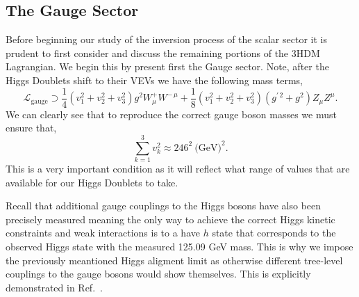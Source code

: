 % 
%

\subsection{The Gauge Sector}

Before beginning our study of the inversion process of the scalar sector it is prudent to first consider and discuss the remaining portions of the 3HDM Lagrangian. 
%
We begin this by present first the Gauge sector. 
%
Note, after the Higgs Doublets shift to their VEVs we have the following mass terms, 
%
\begin{equation}
\mathcal{L}_{\text{gauge}} \supset \frac{1}{4} \left( v_1^2 + v_2^2  + v_3^2 \right) g^2 W^+_\mu W^{-\,\mu} + \frac{1}{8} \left(  v_1^2 + v_2^2  + v_3^2  \right) \left( g^{\prime \, 2} + g^2 \right) Z_\mu Z^\mu  .
\end{equation}
%
We can clearly see that to reproduce the correct gauge boson masses we must ensure that,
%
\begin{equation}
\label{eq:VEV_Condition}
\sum_{k=1}^3 v_k^2 \approx 246^2 \ \text{(GeV)}^2  . 
\end{equation}
%
This is a very important condition as it will reflect what range of values that are available for our Higgs Doublets to take.

Recall that additional gauge couplings to the Higgs bosons have also been precisely measured meaning the only way to achieve the correct Higgs kinetic constraints and weak interactions is to a have $h$ state that corresponds to the observed Higgs state with the measured 125.09 GeV mass. 
%
This is why we impose the previously meantioned Higgs aligment limit as otherwise different tree-level couplings to the gauge bosons would show themselves. 
%
This is explicitly demonstrated in Ref.~\cite{das2015implications}. 

